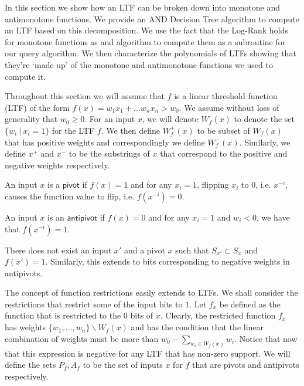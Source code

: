 In this section we show how an LTF can be broken down into monotone and antimonotone functions. We provide an \textsf{AND} Decision Tree algorithm to compute an LTF based on this decomposition. We use the fact that the Log-Rank holds for monotone functions as and algorithm to compute them as a subroutine for our query algorithm. We then characterize the polynomials of LTFs showing that they're `made up' of the monotone and antimonotone functions we used to compute it.

Throughout this section we will assume that $f$ is a linear threshold function (LTF) of the form $f(x) = w_1x_1 + ... w_nx_n > w_0$. We assume  without loss of generality that $w_0 \geq 0$. For an input $x$, we will denote $W_f(x)$ to denote the set $\{w_i \ | \ x_i = 1\}$ for the LTF $f$. We then define $W^+_f(x)$ to be subset of $W_f(x)$ that has positive weights and correspondingly we define $W^-_f(x)$. Similarly, we define $x^+$ and $x^-$ to be the substrings of $x$ that correspond to the positive and negative weights respectively.

\begin{definition}
	An input $x$ is a $\mathsf{pivot}$ if $f(x) = 1$ and for any $x_i = 1$, flipping $x_i$ to $0$, i.e. $x^{-i}$, causes the function value to flip, i.e. $f(x^{-i}) = 0$. 
\end{definition}

\begin{definition}
	An input $x$ is an $\mathsf{antipivot}$ if $f(x) = 0$ and for any $x_i = 1$ and $w_i < 0$, we have that $f(x^{-i}) = 1$. 
\end{definition}

\begin{fact}\label{fact1}
	There does not exist an input $x'$ and a pivot $x$ such that $S_{x'} \subset S_x$ and $f(x') = 1$. Similarly, this extends to bits corresponding to negative weights in antipivots. 
\end{fact}

The concept of function restrictions easily extends to LTFs. We shall consider the restrictions that restrict some of the input bits to $1$. Let $f_x$ be defined as the function that is restricted to the $0$ bits of $x$. Clearly, the restricted function $f_x$ has weights $\{w_1, ..., w_n\} \backslash W_f(x)$ and has the condition that the linear combination of weights must be more than $w_0 - \sum_{w_i \in W_f(x)} w_i$. Notice that now that this expression is negative for any LTF that has non-zero support. We will define the sets $P_f, A_f$ to be the set of inputs $x$ for $f$ that are pivots and antipivots respectively. 

